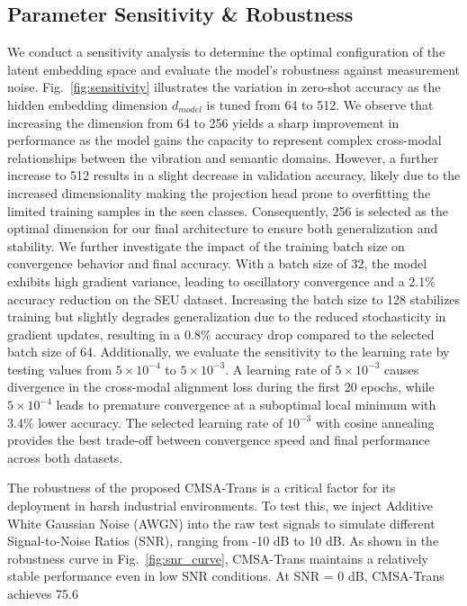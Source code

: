 \subsection{Parameter Sensitivity & Robustness}
We conduct a sensitivity analysis to determine the optimal configuration of the latent embedding space and evaluate the model's robustness against measurement noise. Fig.~\ref{fig:sensitivity} illustrates the variation in zero-shot accuracy as the hidden embedding dimension $d_{model}$ is tuned from 64 to 512. We observe that increasing the dimension from 64 to 256 yields a sharp improvement in performance as the model gains the capacity to represent complex cross-modal relationships between the vibration and semantic domains. However, a further increase to 512 results in a slight decrease in validation accuracy, likely due to the increased dimensionality making the projection head prone to overfitting the limited training samples in the seen classes. Consequently, 256 is selected as the optimal dimension for our final architecture to ensure both generalization and stability. We further investigate the impact of the training batch size on convergence behavior and final accuracy. With a batch size of 32, the model exhibits high gradient variance, leading to oscillatory convergence and a 2.1\% accuracy reduction on the SEU dataset. Increasing the batch size to 128 stabilizes training but slightly degrades generalization due to the reduced stochasticity in gradient updates, resulting in a 0.8\% accuracy drop compared to the selected batch size of 64. Additionally, we evaluate the sensitivity to the learning rate by testing values from $5 \times 10^{-4}$ to $5 \times 10^{-3}$. A learning rate of $5 \times 10^{-3}$ causes divergence in the cross-modal alignment loss during the first 20 epochs, while $5 \times 10^{-4}$ leads to premature convergence at a suboptimal local minimum with 3.4\% lower accuracy. The selected learning rate of $10^{-3}$ with cosine annealing provides the best trade-off between convergence speed and final performance across both datasets.

The robustness of the proposed CMSA-Trans is a critical factor for its deployment in harsh industrial environments. To test this, we inject Additive White Gaussian Noise (AWGN) into the raw test signals to simulate different Signal-to-Noise Ratios (SNR), ranging from -10 dB to 10 dB. As shown in the robustness curve in Fig.~\ref{fig:snr_curve}, CMSA-Trans maintains a relatively stable performance even in low SNR conditions. At SNR = 0 dB, CMSA-Trans achieves 75.6%

